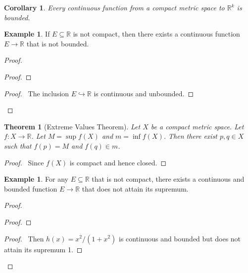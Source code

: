 \documentclass{book}
\let\qed\relax
\newtheorem{cor}{Corollary}[prop]
\newtheorem{thm}[prop]{Theorem}
\theoremstyle{definition}
\newtheorem{ex}[prop]{Example}
\begin{document}
\begin{cor}
Every continuous function from a compact metric space to $\mathbb{R}^k$ is bounded.
\end{cor}

\begin{ex}
If $E \subseteq \mathbb{R}$ is not compact, then there exists a continuous function $E \rightarrow \mathbb{R}$ that is not bounded.
\end{ex}

\begin{proof}
\pf
{}
\begin{proof}
\end{proof}
\begin{proof}
	\pf\ The inclusion $E \hookrightarrow \mathbb{R}$ is continuous and unbounded.
\end{proof}
\qed
\end{proof}

\begin{thm}[Extreme Values Theorem]
Let $X$ be a compact metric space. Let $f : X \rightarrow \mathbb{R}$. Let $M = \sup f(X)$ and $m = \inf f(X)$. Then there exist $p,q \in X$ such that $f(p) = M$ and $f(q) \in m$.
\end{thm}

\begin{proof}
\pf\ Since $f(X)$ is compact and hence closed. \qed
\end{proof}

\begin{ex}
For any $E \subseteq \mathbb{R}$ that is not compact, there exists a continuous and bounded function $E \rightarrow \mathbb{R}$ that does not attain its supremum.
\end{ex}

\begin{proof}
\pf
{}
\begin{proof}
\end{proof}
\begin{proof}
	\pf\ Then $h(x) = x^2/(1+x^2)$ is continuous and bounded but does not attain its supremum 1.
\end{proof}
\qed
\end{proof}
\end{document}
